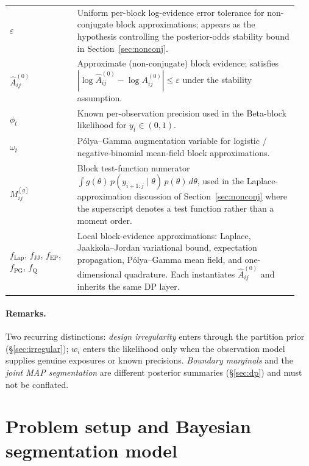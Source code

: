 \begin{longtable}{@{}p{0.22\linewidth}p{0.72\linewidth}@{}}
\midrule
$\varepsilon$ & Uniform per-block log-evidence error tolerance for non-conjugate block approximations; appears as the hypothesis controlling the posterior-odds stability bound in Section~\ref{sec:nonconj}. \\
$\widehat A^{(0)}_{ij}$ & Approximate (non-conjugate) block evidence; satisfies $|\log\widehat A^{(0)}_{ij} - \log A^{(0)}_{ij}| \le \varepsilon$ under the stability assumption. \\
$\phi_t$ & Known per-observation precision used in the Beta-block likelihood for $y_t\in(0,1)$. \\
$\omega_t$ & P\'olya--Gamma augmentation variable for logistic / negative-binomial mean-field block approximations. \\
$M^{[g]}_{ij}$ & Block test-function numerator $\int g(\theta)\, p(y_{i+1:j}\mid \theta)\, p(\theta)\, d\theta$, used in the Laplace-approximation discussion of Section~\ref{sec:nonconj} where the superscript denotes a test function rather than a moment order. \\
\midrule
$f_{\mathrm{Lap}}$, $f_{\mathrm{JJ}}$, $f_{\mathrm{EP}}$, $f_{\mathrm{PG}}$, $f_{\mathrm{Q}}$ & Local block-evidence approximations:
Laplace, Jaakkola--Jordan variational bound, expectation propagation, P\'olya--Gamma mean field,
and one-dimensional quadrature. Each instantiates $\widehat A^{(0)}_{ij}$ and inherits the same DP layer. \\
\bottomrule
\end{longtable}

\paragraph{Remarks.}
Two recurring distinctions: \emph{design irregularity} enters through the partition prior
(\S\ref{sec:irregular}); $w_i$ enters the likelihood only when the observation model supplies
genuine exposures or known precisions. \emph{Boundary marginals} and the \emph{joint MAP
segmentation} are different posterior summaries (\S\ref{sec:dp}) and must not be conflated.

\section{Problem setup and Bayesian segmentation model}
\label{sec:setup}


